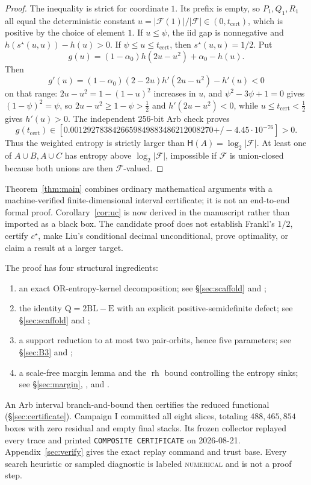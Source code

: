 \documentclass[11pt]{article}
\theoremstyle{plain}
\theoremstyle{definition}
\theoremstyle{remark}
\newcommand{\rh}{\operatorname{rh}}
\newcommand{\sstar}{s^{\star}}
\newcommand{\Lb}{\mathrm{L}}
\newcommand{\Bb}{\mathrm{B}}
\newcommand{\Qq}{\mathrm{Q}}
\newcommand{\Ee}{\mathrm{E}}
\newcommand{\NUMERICAL}{\textsc{numerical}}
\begin{document}
\begin{proof}
The inequality is strict for coordinate \(1\).  Its prefix is empty, so
\(P_1,Q_1,R_1\) all equal the deterministic constant
\(u=|\mathcal F(1)|/|\mathcal F|\in(0,t_{\mathrm{cert}})\), which is positive
by the choice of element \(1\).  If \(u\le\psi\), the iid gap is
nonnegative and
\(h(\sstar(u,u))-h(u)>0\).  If
\(\psi\le u\le t_{\mathrm{cert}}\), then \(\sstar(u,u)=1/2\).  Put
\[
g(u)=(1-\alpha_0)h(2u-u^2)+\alpha_0-h(u).
\]
Then
\[
g'(u)=(1-\alpha_0)(2-2u)h'(2u-u^2)-h'(u)<0
\]
on that range: \(2u-u^2=1-(1-u)^2\) increases in \(u\), and
\(\psi^2-3\psi+1=0\) gives \((1-\psi)^2=\psi\), so
\(2u-u^2\ge1-\psi>\tfrac12\) and \(h'(2u-u^2)<0\), while
\(u\le t_{\mathrm{cert}}<\tfrac12\) gives \(h'(u)>0\).
The independent 256-bit Arb check
 proves
\[
g(t_{\mathrm{cert}})
\in[0.0012927838426659849883486212008270
\mathbin{+/-}4.45\cdot10^{-76}]>0.
\]
Thus the weighted entropy is strictly larger than
\(\mathsf H(A)=\log_2|\mathcal F|\).  At least one of \(A\cup B,A\cup C\)
has entropy above \(\log_2|\mathcal F|\), impossible if \(\mathcal F\) is
union-closed because both unions are then \(\mathcal F\)-valued.
\end{proof}

Theorem~\ref{thm:main} combines ordinary mathematical arguments with a
machine-verified finite-dimensional interval certificate; it is not an
end-to-end formal proof.  Corollary~\ref{cor:uc} is now derived in the
manuscript rather than imported as a black box.  The candidate proof does not
establish Frankl's \(1/2\), certify \(c^\star\), make Liu's conditional
decimal unconditional, prove optimality, or claim a result at a larger target.

The proof has four structural ingredients:
\begin{enumerate}
\item[(A)] an exact OR-entropy-kernel decomposition; see
\S\ref{sec:scaffold} and ;
\item[(A${}'$)] the identity $\Qq=2\Bb\Lb-\Ee$ with an explicit
positive-semidefinite defect; see \S\ref{sec:scaffold} and
;
\item[(B${}'''$)] a support reduction to at most two pair-orbits, hence five
parameters; see \S\ref{sec:B3} and ;
\item a scale-free margin lemma and the $\rh$ bound controlling the entropy
sinks; see \S\ref{sec:margin}, , and
.
\end{enumerate}
An Arb interval branch-and-bound then certifies the reduced functional
(\S\ref{sec:certificate}).  Campaign I committed all eight slices, totaling
$488{,}465{,}854$ boxes with zero residual and empty final stacks.  Its frozen
collector replayed every trace and printed \texttt{COMPOSITE CERTIFICATE} on
2026-08-21.  Appendix~\ref{sec:verify} gives the exact replay command and
trust base.  Every search heuristic or sampled diagnostic is labeled
\NUMERICAL{} and is not a proof step.
\end{document}
